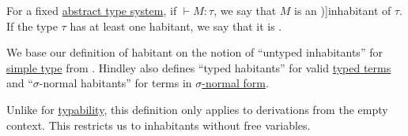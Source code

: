 \begin{definition}\label{def:type_habitation}
  For a fixed \hyperref[def:abstract_type_system]{abstract type system}, if \( {}\vdash M: \tau \), we say that \( M \) is an \term[en=untyped inhabitant (\cite[8A1]{Hindley1997STT})]{inhabitant} of \( \tau \). If the type \( \tau \) has at least one habitant, we say that it is .
\end{definition}
\begin{comments}
  \item We base our definition of habitant on the notion of \enquote{untyped inhabitants} for \hyperref[def:simple_type]{simple type} from \cite[def. 8A1]{Hindley1997STT}. Hindley also defines \enquote{typed habitants} for valid \hyperref[def:typed_lambda_term]{typed terms} and \enquote{\( \sigma \)-normal habitants} for terms in \hyperref[def:lambda_reduction_normal_form]{\( \sigma \)-normal form}.

  \item Unlike for \hyperref[def:typability]{typability}, this definition only applies to derivations from the empty context. This restricts us to inhabitants without free variables.
\end{comments}

